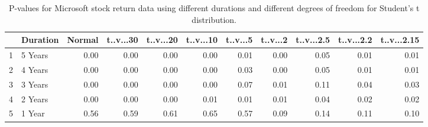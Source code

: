 \begin{table}[ht]
\centering
\caption{P-values for Microsoft stock return data using different durations
  and different degrees of freedom for Student's t distribution.} 
\label{table:microsoft}
\begin{tabular}{rlrrrrrrrrr}
  \hline
 & Duration & Normal & t..v...30 & t..v...20 & t..v...10 & t..v...5 & t..v...2 & t..v...2.5 & t..v...2.2 & t..v...2.15 \\ 
  \hline
1 & 5 Years & 0.00 & 0.00 & 0.00 & 0.00 & 0.01 & 0.00 & 0.05 & 0.01 & 0.01 \\ 
  2 & 4 Years & 0.00 & 0.00 & 0.00 & 0.00 & 0.03 & 0.00 & 0.05 & 0.01 & 0.01 \\ 
  3 & 3 Years & 0.00 & 0.00 & 0.00 & 0.00 & 0.07 & 0.01 & 0.11 & 0.04 & 0.03 \\ 
  4 & 2 Years & 0.00 & 0.00 & 0.00 & 0.01 & 0.01 & 0.01 & 0.04 & 0.02 & 0.02 \\ 
  5 & 1 Year & 0.56 & 0.59 & 0.61 & 0.65 & 0.57 & 0.09 & 0.14 & 0.11 & 0.10 \\ 
   \hline
\end{tabular}
\end{table}

